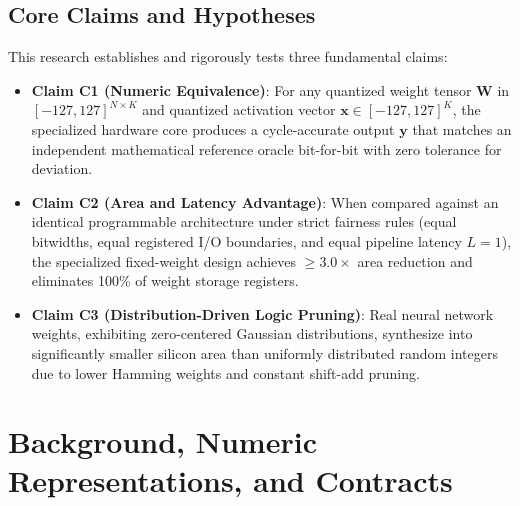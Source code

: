 \documentclass[11pt,a4paper]{article}
\begin{document}
\subsection{Core Claims and Hypotheses}
This research establishes and rigorously tests three fundamental claims:
\begin{itemize}
    \item \textbf{Claim C1 (Numeric Equivalence)}: For any quantized weight tensor $\mathbf{W}$ in $[-127, 127]^{N \times K}$ and quantized activation vector $\mathbf{x} \in [-127, 127]^{K}$, the specialized hardware core produces a cycle-accurate output $\mathbf{y}$ that matches an independent mathematical reference oracle bit-for-bit with zero tolerance for deviation.
    \item \textbf{Claim C2 (Area and Latency Advantage)}: When compared against an identical programmable architecture under strict fairness rules (equal bitwidths, equal registered I/O boundaries, and equal pipeline latency $L=1$), the specialized fixed-weight design achieves $\ge 3.0\times$ area reduction and eliminates 100\% of weight storage registers.
    \item \textbf{Claim C3 (Distribution-Driven Logic Pruning)}: Real neural network weights, exhibiting zero-centered Gaussian distributions, synthesize into significantly smaller silicon area than uniformly distributed random integers due to lower Hamming weights and constant shift-add pruning.
\end{itemize}

\section{Background, Numeric Representations, and Contracts}
\end{document}
